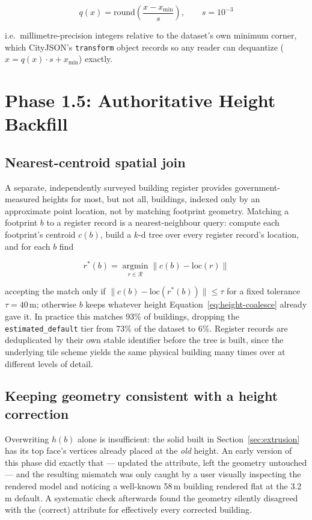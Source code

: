 \documentclass[11pt]{article}
\newcommand{\code}[1]{\texttt{#1}}
\begin{document}
\begin{equation}
  q(x) = \mathrm{round}\!\left(\frac{x - x_{\min}}{s}\right), \qquad s = 10^{-3}
  \label{eq:quantize}
\end{equation}

i.e.\ millimetre-precision integers relative to the dataset's own minimum corner, which
CityJSON's \texttt{transform} object records so any reader can dequantize
($x = q(x)\cdot s + x_{\min}$) exactly.

\section{Phase 1.5: Authoritative Height Backfill}
\label{sec:backfill}

\subsection{Nearest-centroid spatial join}

A separate, independently surveyed building register provides government-measured heights for
most, but not all, buildings, indexed only by an approximate point location, not by matching
footprint geometry. Matching a footprint $b$ to a register record is a nearest-neighbour
query: compute each footprint's centroid $c(b)$, build a $k$-d tree over every register
record's location, and for each $b$ find

\begin{equation}
  r^*(b) = \operatorname*{argmin}_{r \in \mathcal{R}} \lVert c(b) - \mathrm{loc}(r) \rVert
\end{equation}

accepting the match only if $\lVert c(b) - \mathrm{loc}(r^*(b)) \rVert \le \tau$ for a fixed
tolerance $\tau = 40$\,m; otherwise $b$ keeps whatever height Equation~\ref{eq:height-coalesce}
already gave it. In practice this matches 93\% of buildings, dropping the
\code{estimated\_default} tier from 73\% of the dataset to 6\%. Register records are
deduplicated by their own stable identifier before the tree is built, since the underlying
tile scheme yields the same physical building many times over at different levels of detail.

\subsection{Keeping geometry consistent with a height correction}
\label{sec:backfill-geometry}

Overwriting $h(b)$ alone is insufficient: the solid built in Section~\ref{sec:extrusion} has
its top face's vertices already placed at the \emph{old} height. An early version of this
phase did exactly that --- updated the attribute, left the geometry untouched --- and the
resulting mismatch was only caught by a user visually inspecting the rendered model and
noticing a well-known 58\,m building rendered flat at the 3.2\,m default. A systematic check
afterwards found the geometry silently disagreed with the (correct) attribute for effectively
every corrected building.
\end{document}
